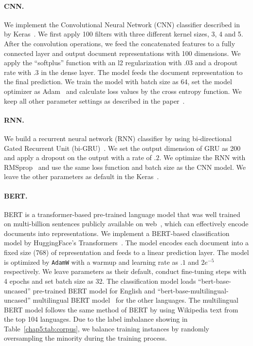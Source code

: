 \paragraph{CNN.} 
We implement the Convolutional Neural Network (CNN) classifier described in~\cite{kim2014convolutional, zimmerman2018improving} by Keras~\cite{chollet2015keras}.
We first apply 100 filters with three different kernel sizes, 3, 4 and 5.
After the convolution operations, we feed the concatenated features to a fully connected layer and output document representations with 100 dimensions.
We apply the ``softplus'' function with an l2 regularization with $.03$ and a dropout rate with $.3$ in the dense layer.
The model feeds the document representation to the final prediction.
We train the model with batch size as 64, set the model optimizer as Adam~\cite{kingma2014adam} and calculate loss values by the cross entropy function.
We keep all other parameter settings as described in the paper~\cite{kim2014convolutional}.


\paragraph{RNN.}
We build a recurrent neural network (RNN) classifier by using bi-directional Gated Recurrent Unit (bi-GRU)~\cite{chung2014empirical, park2018reducing}.
We set the output dimension of GRU as 200 and apply a dropout on the output with a rate of $.2$.
We optimize the RNN with RMSprop~\cite{tieleman2012lecture} and use the same loss function and batch size as the CNN model.
We leave the other parameters as default in the Keras~\cite{chollet2015keras}.


\paragraph{BERT.}
BERT is a transformer-based pre-trained language model that was well trained on multi-billion sentences publicly available on web~\cite{devlin2019bert}, which can effectively encode documents into representations.
We implement a BERT-based classification model by HuggingFace's Transformers~\cite{Wolf2019HuggingFacesTS}.
The model encodes each document into a fixed size (768) of representation and feeds to a linear prediction layer.
The model is optimized by \texttt{AdamW} with a warmup and learning rate as $.1$ and $2e^{-5}$ respectively.
We leave parameters as their default, conduct fine-tuning steps with 4 epochs and set batch size as 32.
The classification model loads ``bert-base-uncased'' pre-trained BERT model for English and ``bert-base-multilingual-uncased'' multilingual BERT model~\cite{gertner2019mitre} for the other languages.
The multilingual BERT model follows the same method of BERT by using Wikipedia text from the top 104 languages.
Due to the label imbalance showing in Table~\ref{chap5:tab:corpus}, we balance training instances by randomly oversampling the minority during the training process.


